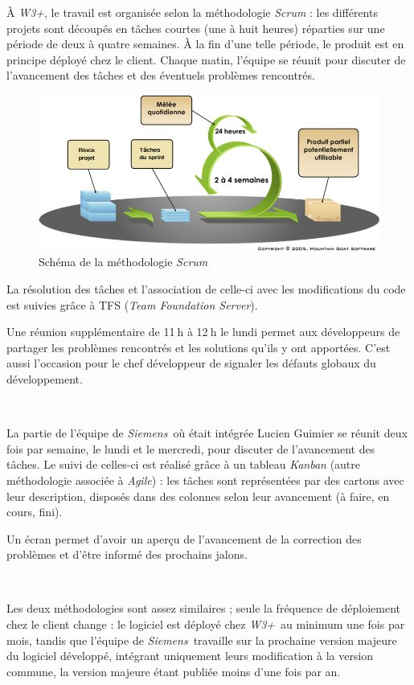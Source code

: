 \documentclass[a4paper, oneside, 12pt]{article}
\def\www{\emph{W3+}}
\def\siemens{\emph{Siemens}}
\begin{document}
À \www, le travail est organisée selon la méthodologie \emph{Scrum} : les différents projets sont découpés en tâches courtes (une à huit heures) réparties sur une période de deux à quatre semaines. À la fin d’une telle période, le produit est en principe déployé chez le client. Chaque matin, l’équipe se réunit pour discuter de l’avancement des tâches et des éventuels problèmes rencontrés.

\begin{figure}[H]
	\centering
	\includegraphics[width=12cm]{img/scrum.png}
	\caption{Schéma de la méthodologie \emph{Scrum}}
\end{figure}

La résolution des tâches et l’association de celle-ci avec les modifications du code est suivies grâce à TFS (\emph{Team Foundation Server}).

Une réunion supplémentaire de 11$~$h à 12$~$h le lundi permet aux développeurs de partager les problèmes rencontrés et les solutions qu’ils y ont apportées. C’est aussi l’occasion pour le chef développeur de signaler les défauts globaux du développement.

\ 

La partie de l’équipe de \siemens\ où était intégrée Lucien {\sc Guimier} se réunit deux fois par semaine, le lundi et le mercredi, pour discuter de l’avancement des tâches. Le suivi de celles-ci est réalisé grâce à un tableau \emph{Kanban} (autre méthodologie associée à \emph{Agile}) : les tâches sont représentées par des cartons avec leur description, disposés dans des colonnes selon leur avancement (à faire, en cours, fini).

Un écran permet d’avoir un aperçu de l’avancement de la correction des problèmes et d’être informé des prochains jalons.

\ 

Les deux méthodologies sont assez similaires ; seule la fréquence de déploiement chez le client change : le logiciel est déployé chez \www\ au minimum une fois par mois, tandis que l’équipe de \siemens\ travaille sur la prochaine version majeure du logiciel développé, intégrant uniquement leurs modification à la version commune, la version majeure étant publiée moins d’une fois par an.
\end{document}
